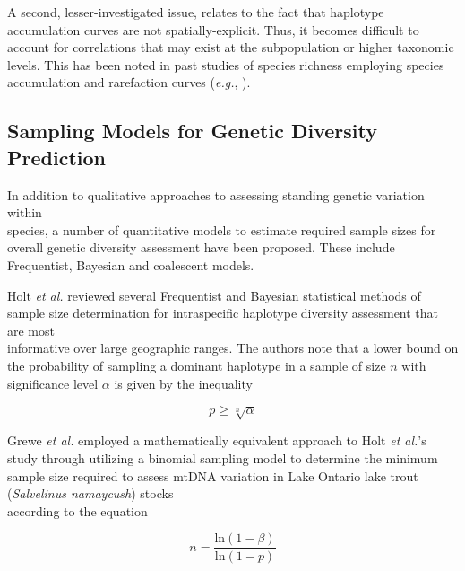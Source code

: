 A second, lesser-investigated issue, relates to the fact that haplotype accumulation curves are not spatially-explicit. Thus, it becomes difficult to account for correlations that may exist at the subpopulation or higher taxonomic levels. This has been noted in past studies of species richness employing species accumulation and rarefaction curves (\textit{e.g.}, \cite{bevilacqua2017approach, chiarucci2009spatially, terlizzi2014species}).



\subsection{Sampling Models for Genetic Diversity Prediction}

In addition to qualitative approaches to assessing standing genetic variation within \\ species, a number of quantitative models to estimate required sample sizes for overall genetic diversity assessment have been proposed. These include Frequentist, Bayesian and coalescent models.



Holt \textit{et al.} \cite{holt2007experimental} reviewed several Frequentist and Bayesian statistical methods of sample size determination for intraspecific haplotype diversity assessment that are most \\ informative over large geographic ranges. The authors note that a lower bound on the probability of sampling a dominant haplotype in a sample of size $n$ with significance level $\alpha$ is given by the inequality

\begin{equation}
p \geq \sqrt[n]{\alpha}
\end{equation}



Grewe \textit{et al.} \cite{grewe1993mitochondrial} employed a mathematically equivalent approach to Holt \textit{et al.}'s \cite{holt2007experimental} study through utilizing a binomial sampling model to determine the minimum sample size required to assess mtDNA variation in Lake Ontario lake trout (\textit{Salvelinus namaycush}) stocks \\ according to the equation

\begin{equation}
n=\frac{\textrm{ln}(1 - \beta)}{\textrm{ln}(1 - p)}
\end{equation}



